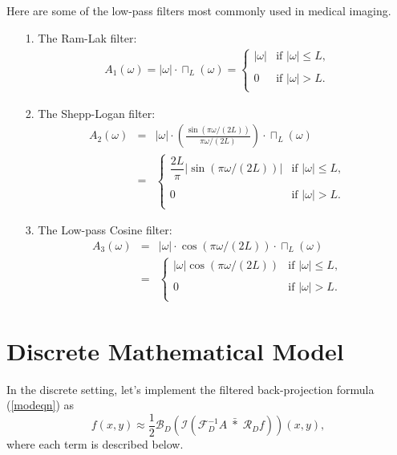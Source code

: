 \noindent
Here are some of the low-pass filters most commonly used in medical imaging. 

\begin{itemize}
\item[1.] The Ram-Lak filter:
\begin{eqnarray} \nonumber
A_1(\omega) = |\omega| \cdot \sqcap_{L}(\omega) = \left\{
\begin{array}{ll}
 |\omega | &\text{if } |\omega | \leq L,\\
 & \\
0 & \text{if  } |\omega | > L.\\
\end{array} \right.
\end{eqnarray}

\item[2.] The Shepp-Logan filter:
\begin{eqnarray}
A_2(\omega) &=& |\omega | \cdot \left( \frac{\sin(\pi \omega / (2L))}{\pi \omega / (2L)}\right) \cdot \sqcap_{L}(\omega) \nonumber \\
 &=& \left\{
\begin{array}{ll}
 \dfrac{2L}{\pi} |\sin(\pi \omega / (2L))| & \text{if } |\omega | \leq L,\\
 & \\
0 & \text{if  } |\omega | > L.\\
\end{array} \right. \nonumber
\end{eqnarray}

\item[3.] The Low-pass Cosine filter:
\begin{eqnarray}
A_3(\omega) &=& |\omega | \cdot \cos(\pi \omega / (2L)) \cdot \sqcap_{L}(\omega) \nonumber \\
 &=& \left\{
\begin{array}{ll}
 |\omega |\cos(\pi \omega / (2L)) & \text{if } |\omega | \leq L,\\
 & \\
0 & \text{if  } |\omega | > L.\\
\end{array} \right. \nonumber
\end{eqnarray}
\end{itemize} 



\section{Discrete Mathematical Model}
In the discrete setting, let's implement the filtered back-projection formula (\ref{modeqn}) as
$$
f(x, y) \approx   \frac{1}{2} \mathscr{B}_D \left( \mathscr{I} \left( \mathscr{F}^{-1}_{D} A \; \bar{*} \; \mathscr{R}_D f \right)\right)(x, y),
$$
where each term is described below. 
